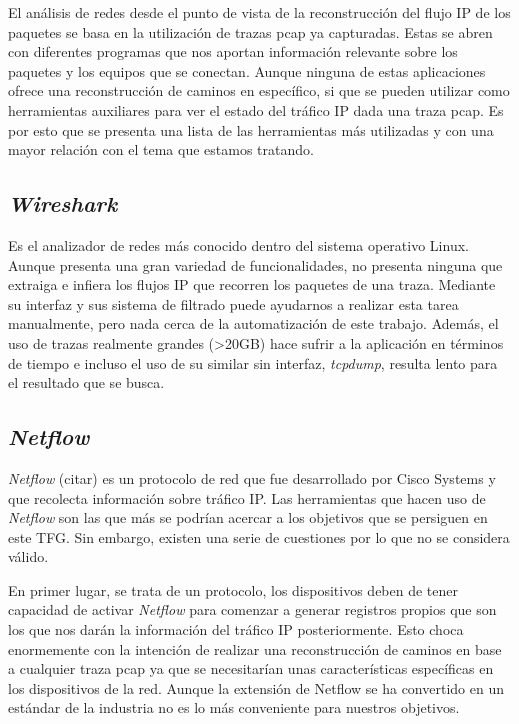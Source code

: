\documentclass[twoside, 12pt]{epstfg}
\begin{document}
El análisis de redes desde el punto de vista de la reconstrucción del flujo IP de los paquetes se basa en la utilización de trazas pcap ya capturadas. Estas se abren con diferentes programas que nos aportan información relevante sobre los paquetes y los equipos que se conectan. Aunque ninguna de estas aplicaciones ofrece una reconstrucción de caminos en específico, si que se pueden utilizar como herramientas auxiliares para ver el estado del tráfico IP dada una traza pcap. Es por esto que se presenta una lista de las herramientas más utilizadas y con una mayor relación con el tema que estamos tratando. \cite{Gandhi2014}

\subsection{\textit{Wireshark}}
Es el analizador de redes más conocido dentro del sistema operativo Linux. Aunque presenta una gran variedad de funcionalidades, no presenta ninguna que extraiga e infiera los flujos IP que recorren los paquetes de una traza. Mediante su interfaz y sus sistema de filtrado puede ayudarnos a realizar esta tarea manualmente, pero nada cerca de la automatización de este trabajo. Además, el uso de trazas realmente grandes (>20GB) hace sufrir a la aplicación en términos de tiempo e incluso el uso de su similar sin interfaz, \textit{tcpdump}, resulta lento para el resultado que se busca.

\subsection{\textit{Netflow}}
\textit{Netflow} (citar) es un protocolo de red que fue desarrollado por Cisco Systems y que recolecta información sobre tráfico IP. Las herramientas que hacen uso de \textit{Netflow} son las que más se podrían acercar a los objetivos que se persiguen en este TFG. Sin embargo, existen una serie de cuestiones por lo que no se considera válido. %

En primer lugar, se trata de un protocolo, los dispositivos deben de tener capacidad de activar \textit{Netflow} para comenzar a generar registros propios que son los que nos darán la información del tráfico IP posteriormente. Esto choca enormemente con la intención de realizar una reconstrucción de caminos en base a cualquier traza pcap ya que se necesitarían unas características
específicas en los dispositivos de la red. Aunque la extensión de Netflow se ha convertido en un estándar de la industria no es lo más conveniente para nuestros objetivos.
\end{document}

